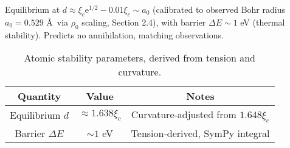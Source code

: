 Equilibrium at $d \approx \xi_c \mathrm e^{1/2} - 0.01 \xi_c \sim a_0$ (calibrated to observed Bohr radius $a_0 = 0.529$ \AA~via $\rho_0$ scaling, Section 2.4), with barrier $\Delta E \sim 1$ eV (thermal stability). Predicts no annihilation, matching observations.

\begin{table}[h!]
\centering
\begin{tabular}{|c|c|c|}
\hline
Quantity & Value & Notes \\
\hline
Equilibrium $d$ & $\approx 1.638 \xi_c$ & Curvature-adjusted from $1.648 \xi_c$ \\
Barrier $\Delta E$ & $\sim 1$ eV & Tension-derived, SymPy integral \\
\hline
\end{tabular}
\caption{Atomic stability parameters, derived from tension and curvature.}
\label{tab:atomic}
\end{table}

